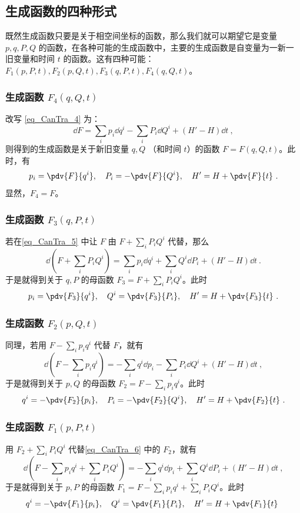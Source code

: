 \subsection{生成函数的四种形式}
既然生成函数只要是关于相空间坐标的函数，那么我们就可以期望它是变量 $p,q,P,Q$ 的函数，在各种可能的生成函数中，主要的生成函数是自变量为一新一旧变量和时间 $t$ 的函数。这有四种可能：$F_1(p,P,t),F_2(p,Q,t),F_3(q,P,t),F_4(q,Q,t)$。
\subsubsection{生成函数 $F_4(q,Q,t)$}
改写 \autoref{eq_CanTra_4} 为：
\begin{equation}\label{eq_CanTra_5}
\dd F=\sum_ip_i\dd q^i-\sum_iP_i\dd Q^i+(H'-H)\dd t~,
\end{equation}
则得到的生成函数是关于新旧变量 $q,Q$ （和时间 $t$）的函数 $F=F(q,Q,t)$。此时，有
\begin{equation}
p_i=\pdv{F}{q^i},\quad P_i=-\pdv{F}{Q^i},\quad H'=H+\pdv{F}{t}~.
\end{equation}
显然，$F_4=F$。
\subsubsection{生成函数 $F_3(q,P,t)$}
若在\autoref{eq_CanTra_5} 中让 $F$ 由 $F+\sum_iP_i Q^i$ 代替，那么
\begin{equation}
\dd (F+\sum_iP_iQ^i)=\sum_i p_i\dd q^i+\sum_i Q^i\dd P_i+(H'-H)\dd t~.
\end{equation}
于是就得到关于 $q,P$ 的母函数 $F_3=F+\sum_iP_i Q^i$。此时
\begin{equation}\label{eq_CanTra_8}
p_i=\pdv{F_3}{q^i},\quad Q^i=\pdv{F_3}{P_i},\quad H'=H+\pdv{F_3}{t}~.
\end{equation}

\subsubsection{生成函数 $F_2(p,Q,t)$}
同理，若用 $F-\sum_ip_iq^i$ 代替 $F$，就有
\begin{equation}\label{eq_CanTra_6}
\dd (F-\sum_ip_i q^i)=-\sum_i q^i\dd p_i-\sum_i P_i\dd Q^i+(H'-H)\dd t~,
\end{equation}
于是就得到关于 $p,Q$ 的母函数 $F_2=F-\sum_ip_i q^i$。此时
\begin{equation}
q^i=-\pdv{F_2}{p_i},\quad P_i=-\pdv{F_2}{Q^i},\quad H'=H+\pdv{F_2}{t}~.
\end{equation}
\subsubsection{生成函数 $F_1(p,P,t)$}
用 $F_2+\sum_iP_iQ^i$ 代替\autoref{eq_CanTra_6} 中的 $F_2$，就有
\begin{equation}
\dd(F-\sum_ip_i q^i+\sum_i P_i Q^i)=-\sum_i q^i\dd p_i+\sum_i Q^i\dd P_i+(H'-H)\dd t~,
\end{equation}
于是就得到关于 $p,P$ 的母函数 $F_1=F-\sum_ip_i q^i+\sum_i P_i Q^i$。此时
\begin{equation}
q^i=-\pdv{F_1}{p_i},\quad Q^i=\pdv{F_1}{P_i},\quad H'=H+\pdv{F_1}{t}~
\end{equation}

